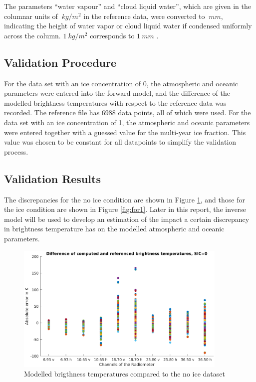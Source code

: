 \documentclass[11pt, a4paper]{article}
\begin{document}
The parameters ``water vapour'' and ``cloud liquid water'', which are given in the columnar units of $\SI{}{kg/m^2}$ in the reference data, were converted to $\SI{}{mm}$, indicating the height of water vapor or cloud liquid water if condensed uniformly across the column. $\SI{1}{kg/m^2}$ corresponds to $\SI{1}{mm}$ \cite{remss}.


\subsection{Validation Procedure}

For the data set with an ice concentration of 0, the atmospheric and oceanic parameters were entered into the forward model, and the difference of the modelled brightness temperatures with respect to the reference data was recorded. The reference file has 6988 data points, all of which were used. For the data set with an ice concentration of 1, the atmospheric and oceanic parameters were entered together with a guessed value for the multi-year ice fraction. This value was chosen to be constant for all datapoints to simplify the validation process.


\subsection{Validation Results}
\label{sec:ForValRes}

The discrepancies for the no ice condition are shown in Figure \ref{fig:for0}, and those for the ice condition are shown in Figure \ref{fig:for1}. Later in this report, the inverse model will be used to develop an estimation of the impact a certain discrepancy in brightness temperature has on the modelled atmospheric and oceanic parameters.

\begin{figure}[h]
   \centering
   \includegraphics[width=0.9\textwidth]{ValidationForward_SIC0.eps}
   \caption{Modelled brigthness temperatures compared to the no ice dataset}
   \label{fig:for0}
\end{figure}
\end{document}
